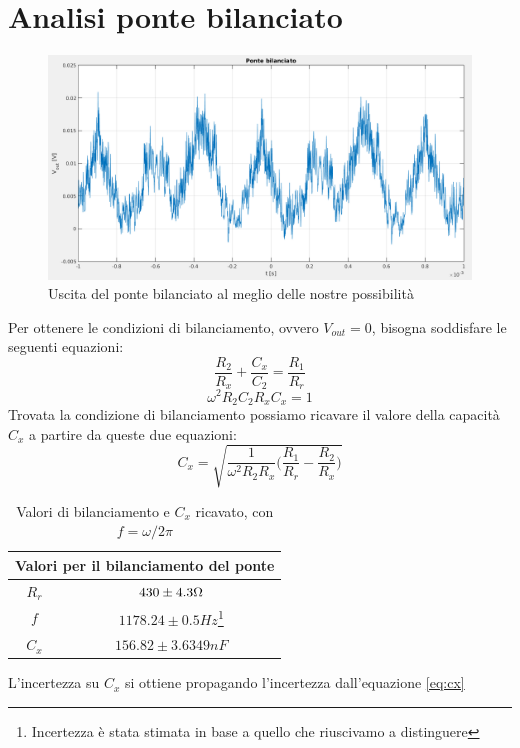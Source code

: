 \documentclass[12pt,]{article}
\begin{document}
\section{Analisi ponte bilanciato}
\begin{figure}[H]
\centering
\includegraphics[width=\textwidth]{pontebilanciato}
\caption{Uscita del ponte bilanciato al meglio delle nostre possibilità}
\end{figure}
Per ottenere le condizioni di bilanciamento, ovvero $V_{out}=0$, bisogna soddisfare le seguenti equazioni: 
 \begin{equation}
 \frac{R_2}{R_x} + \frac{C_x}{C_2} = \frac{R_1}{R_r}
 \end{equation}
 \begin{equation}
 \omega^2 R_2  C_2  R_x  C_x = 1 
 \end{equation}
Trovata la condizione di bilanciamento possiamo ricavare il valore della capacità $C_x$ a partire da queste due equazioni: 
\begin{equation}
\label{eq:cx}
C_x = \sqrt{\frac{1}{\omega^2 R_2 R_x} \biggl(\frac{R_1}{R_r} - \frac{R_2}{R_x} \biggr)}
\end{equation}
\begin{table}[H]
\centering
\begin{tabular}{c|c}
\toprule
\multicolumn{2}{c}{Valori per il bilanciamento del ponte}\\
\midrule
\rowcolor{black!20}$R_r$ & $430 \pm 4.3  \ohm$ \\
$f$ & $ 1178.24\pm 0.5 Hz$\footnote{Incertezza è stata stimata in base a quello che riuscivamo a distinguere}  \\
\rowcolor{black!20}$C_x$ & $156.82 \pm 3.6349 nF $ \\
\bottomrule
\end{tabular}
\caption{Valori di bilanciamento e $C_x$ ricavato, con $f = \omega/2\pi$}
\end{table}
L'incertezza su $C_x$ si ottiene propagando l'incertezza dall'equazione \eqref{eq:cx}
\end{document}
